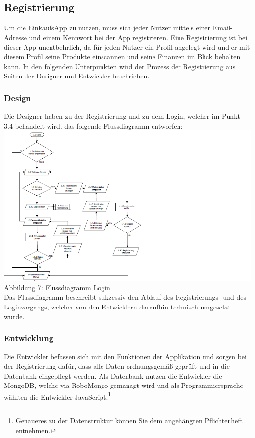 \documentclass[12pt,a4paper]{article}
\begin{document}
\subsection{Registrierung}
Um die EinkaufsApp zu nutzen, muss sich jeder Nutzer mittels einer Email-Adresse und einem Kennwort bei der App registrieren.
Eine Registrierung ist bei dieser App unentbehrlich, da für jeden Nutzer ein Profil angelegt wird und er mit diesem Profil seine Produkte einscannen und seine Finanzen im Blick behalten kann.
In den folgenden Unterpunkten wird der Prozess der Registrierung aus Seiten der Designer und Entwickler beschrieben.
\subsubsection*{Design}
Die Designer haben zu der Registrierung und zu dem Login, welcher im Punkt 3.4 behandelt wird, das folgende Flussdiagramm entworfen:
\\
\includegraphics[scale=0.6, origin=l]{Login-Registrierung.png}
\footnotesize Abbildung 7: Flussdiagramm Login
\normalsize
\\
\linebreak
Das Flussdiagramm beschreibt sukzessiv den Ablauf des Registrierungs- und des Loginvorgangs, welcher von den Entwicklern daraufhin technisch umgesetzt wurde.
\newpage
\subsubsection*{Entwicklung}
Die Entwickler befassen sich mit den Funktionen der Applikation  und sorgen bei der Registrierung dafür, dass alle Daten ordnungsgemäß geprüft und in die Datenbank eingepflegt werden.
Als Datenbank nutzen die Entwickler die MongoDB, welche via RoboMongo gemanagt wird und als Programmiersprache wählten die Entwickler JavaScript.\footnote{Genaueres zu der Datenstruktur können Sie dem angehängten Pflichtenheft entnehmen.}
\end{document}
